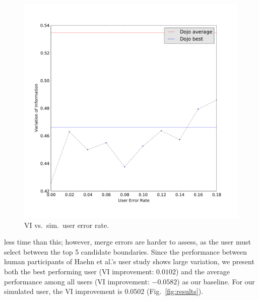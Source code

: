 \begin{figure}
  \vspace{-0.95cm}
  \begin{center}
    \includegraphics[scale=.1]{gfx/new_er.pdf}
  \end{center}
  \vspace{-1cm}
  \caption{VI vs.~sim.~user error rate.}
  \vspace{-1.5cm}
\end{figure}

\noindent less time than this; however, merge errors are harder to assess, as the user must select between the top 5 candidate boundaries. Since the performance between human participants of Haehn et al.'s user study shows large variation, we present both the best performing user (VI improvement: $0.0102$) and the average performance among all users (VI improvement: $-0.0582$) as our baseline. For our simulated user, the VI improvement is $0.0502$ (Fig.~\ref{fig:results}).






